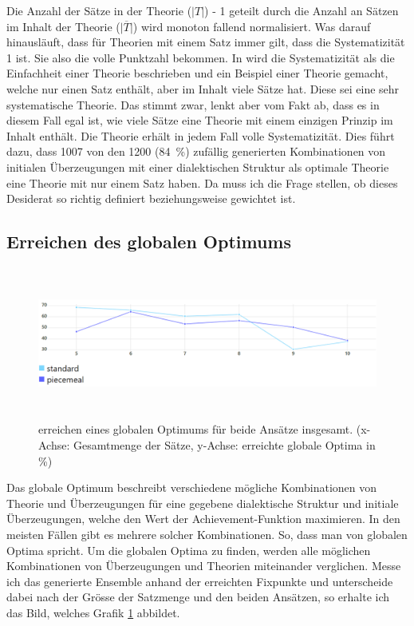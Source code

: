 \documentclass{article}
\begin{document}
Die Anzahl der Sätze in der Theorie ($\lvert T \rvert$) - 1 geteilt durch die Anzahl an Sätzen im Inhalt der Theorie ($\lvert \overline{T} \rvert$) wird monoton fallend normalisiert. Was darauf hinausläuft, dass für Theorien mit einem Satz immer gilt, dass die Systematizität 1 ist. Sie also die volle Punktzahl bekommen. In \autocite[S.~447]{beisbart_making_2021} wird die Systematizität als die Einfachheit einer Theorie beschrieben und ein Beispiel einer Theorie gemacht, welche nur einen Satz enthält, aber im Inhalt viele Sätze hat. Diese sei eine sehr systematische Theorie. Das stimmt zwar, lenkt aber vom Fakt ab, dass es in diesem Fall egal ist, wie viele Sätze eine Theorie mit einem einzigen Prinzip im Inhalt enthält. Die Theorie erhält in jedem Fall volle Systematizität. Dies führt dazu, dass 1007 von den 1200 (84~\%) zufällig generierten Kombinationen von initialen Überzeugungen mit einer dialektischen Struktur als optimale Theorie eine Theorie mit nur einem Satz haben. Da muss ich die Frage stellen, ob dieses Desiderat so richtig definiert beziehungsweise gewichtet ist.

\subsection{Erreichen des globalen Optimums}

\begin{figure}[ht]
  \centering
  \includegraphics[width=\textwidth,height=5cm,keepaspectratio]{images/global_optima_standard_piecemeal.png}
  \caption{erreichen eines globalen Optimums für beide Ansätze insgesamt. (x-Achse: Gesamtmenge der Sätze, y-Achse: erreichte globale Optima in \%) \label{fig:GlobOptPoolsizeLine}}
\end{figure}

Das globale Optimum beschreibt verschiedene mögliche Kombinationen von Theorie und Überzeugungen für eine gegebene dialektische Struktur und initiale Überzeugungen, welche den Wert der Achievement-Funktion maximieren. In den meisten Fällen gibt es mehrere solcher Kombinationen. So, dass man von globalen Optima spricht. Um die globalen Optima zu finden, werden alle möglichen Kombinationen von Überzeugungen und Theorien miteinander verglichen. Messe ich das generierte Ensemble anhand der erreichten Fixpunkte und unterscheide dabei nach der Grösse der Satzmenge und den beiden Ansätzen, so erhalte ich das Bild, welches Grafik \ref{fig:GlobOptPoolsizeLine} abbildet.
\end{document}
